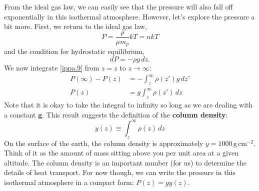 \documentclass[10pt]{article}
\numberwithin{equation}{section}
\newcommand{\n}{\noindent}
\begin{document}
	\n From the ideal gas law, we can easily see that the pressure will also fall off exponentially in this isothermal atmosphere. However, let's explore the pressure a bit more. First, we return to the ideal gas law,
	\begin{equation}
		\label{ippa.8} P=\frac{\rho}{\mu m_p}kT=nkT
	\end{equation}
	and the condition for hydrostatic equilibrium,
	\begin{equation}
		\label{ippa.9} dP=-\rho g\,dz.
	\end{equation}
	We now integrate \eqref{ippa.9} from $z=z$ to $z\to \infty$:
	\begin{align}
		\label{ippa.10} P(\infty)-P(z)&=-\int_z^\infty \rho(z') g\,dz'\\
		\label{ippa.11} P(z) &= g\int_z^\infty \rho(z')\,dz
	\end{align}
	Note that it is okay to take the integral to infinity so long as we are dealing with a constant $\mathbf{g}$. This result suggests the definition of the \textbf{column density}:
	\begin{equation}
		\label{ippa.12} y(z)\equiv \int_z^\infty \rho(z)\,dz
	\end{equation}
	On the surface of the earth, the column density is approximately $y=1000\,\mathrm{g\,cm^{-2}}$. Think of it as the amount of mass sitting above you per unit area at a given altitude. The column density is an important number (for us) to determine the details of heat transport. For now though, we can write the pressure in this isothermal atmosphere in a compact form: $P(z)=gy(z)$.
\end{document}

